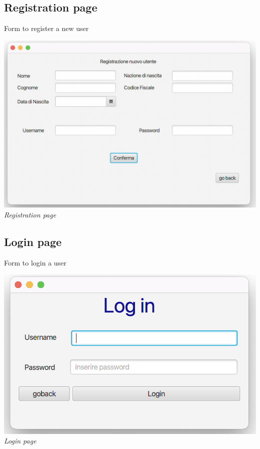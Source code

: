 \documentclass[11pt, oneside]{article}   	%
\begin{document}
\subsection{Registration page}
Form to register a new user
    \begin{center}
    \includegraphics[scale=0.5]{images/ui2.png}\\
    \emph{Registration page}
    \end{center}
\subsection{Login page}
Form to login a user
    \begin{center}
    \includegraphics[scale=0.75]{images/ui3.png}\\
    \emph{Login page}
    \end{center}
\end{document}
